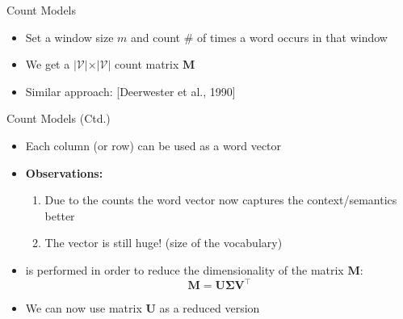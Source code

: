 \begin{frame}{Count Models}{}
	\begin{itemize}
		\item Set a window size $m$ and count \# of times a word occurs in that window
		\item We get a $\vert \mathcal{V} \vert \times \vert \mathcal{V} \vert$ count matrix $\bm{M}$
		\item Similar approach:  [Deerwester et al., 1990]
	\end{itemize}
\end{frame}


\begin{frame}{Count Models (Ctd.)}{}
	\begin{itemize}
		\item Each column (or row) can be used as a word vector
		\item \textbf{Observations:}
		\begin{enumerate}
			\item Due to the counts the word vector now captures the context/semantics better
			\item The vector is still huge! (size of the vocabulary)
		\end{enumerate}
		\item {} is performed in order to reduce the dimensionality of the
			matrix $\bm{M}$:
		\begin{equation*}
			\bm{M} = \bm{U} \bm{\Sigma} \bm{V}^{\intercal}
		\end{equation*}
		\item We can now use matrix $\bm{U}$ as a reduced version
	\end{itemize}
\end{frame}


